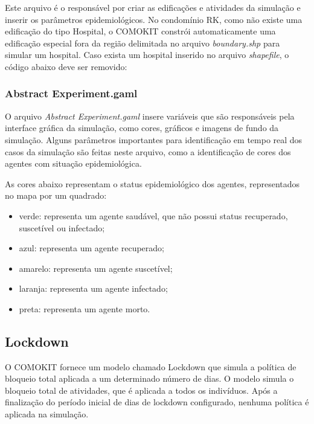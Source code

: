 
Este arquivo é o responsável por criar as edificações e atividades da simulação e inserir os parâmetros epidemiológicos. No condomínio RK, como não existe uma edificação do tipo Hospital, o COMOKIT constrói automaticamente uma edificação especial fora da região delimitada no arquivo \textit{boundary.shp} para simular um hospital. Caso exista um hospital inserido no arquivo \textit{shapefile}, o código abaixo deve ser removido:


\subsubsection{Abstract Experiment.gaml}

O arquivo \textit{Abstract Experiment.gaml} insere variáveis que são responsáveis pela interface gráfica da simulação, como cores, gráficos e imagens de fundo da simulação. Alguns parâmetros importantes para identificação em tempo real dos casos da simulação são feitas neste arquivo, como a identificação de cores dos agentes com situação epidemiológica. 

As cores abaixo representam o status epidemiológico dos agentes, representados no mapa por um quadrado:

\begin{itemize}
\item verde: representa um agente saudável, que não possui status recuperado, suscetível ou infectado;
\item azul: representa um agente recuperado;
\item amarelo: representa um agente suscetível;
\item laranja: representa um agente infectado;
\item preta: representa um agente morto.
\end{itemize}


\subsection{Lockdown}

O COMOKIT fornece um modelo chamado Lockdown que simula a política de bloqueio total aplicada a um determinado número de dias. O modelo simula o bloqueio total de atividades, que é aplicada a todos os indivíduos. Após a finalização do período inicial de dias de lockdown configurado, nenhuma política é aplicada na simulação. 


